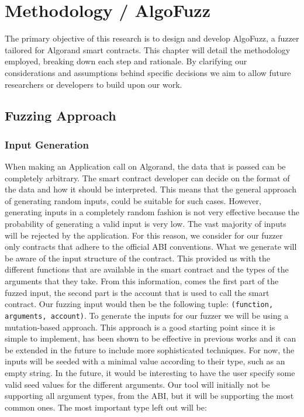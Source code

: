 
\chapter{Methodology / AlgoFuzz}\label{chapter:methodology}
The primary objective of this research is to design and develop AlgoFuzz, a fuzzer tailored for Algorand smart contracts.
This chapter will detail the methodology employed, breaking down each step and rationale.
By clarifying our considerations and assumptions behind specific decisions we aim to allow future researchers or developers to build upon our work.

\section{Fuzzing Approach}

\subsection*{Input Generation}
When making an Application call on Algorand, the data that is passed can be completely arbitrary.
The smart contract developer can decide on the format of the data and how it should be interpreted.
This means that the general approach of generating random inputs, could be suitable for such cases.
However, generating inputs in a completely random fashion is not very effective because the probability of generating a valid input is very low.
The vast majority of inputs will be rejected by the application.
For this reason, we consider for our fuzzer only contracts that adhere to the official \ac{ABI} conventions.
What we generate will be aware of the input structure of the contract.
This provided us with the different functions that are available in the smart contract and the types of the arguments that they take.
From this information, comes the first part of the fuzzed input, the second part is the account that is used to call the smart contract.
Our fuzzing input would then be the following tuple: \texttt{(function, arguments, account)}.
To generate the inputs for our fuzzer we will be using a mutation-based approach.
This approach is a good starting point since it is simple to implement, has been shown to be effective in previous works and it can be extended in the future to include more sophisticated techniques.
For now, the inputs will be seeded with a minimal value according to their type, such as an empty string.
In the future, it would be interesting to have the user specify some valid seed values for the different arguments.
Our tool will initially not be supporting all argument types, from the \ac{ABI}, but it will be supporting the most common ones.
The most important type left out will be:

